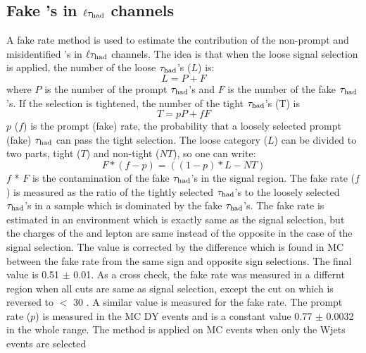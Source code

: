 \subsection{\texorpdfstring{Fake \Tau's in $\ell\tau_{\rm had}$ channels}{Fake taus in lepton-tau channels}}
A fake rate method is used to estimate the contribution of the non-prompt and misidentified \Tau's in $\ell\tau_{\rm had}$ channels. 
The idea is that when the loose signal selection is applied, the number of the loose $\tau_{\rm had}$'s ($L$) is:
\begin{equation}
L = P + F
\end{equation}
where $P$ is the number of the  prompt $\tau_{\rm had}$'s and $F$ is the number of the  fake $\tau_{\rm had}$'s. If the selection is tightened, the number of the tight $\tau_{\rm had}$'s (T) is
\begin{equation}
 T = pP + fF
\end{equation} 
$p$ ($f$) is the prompt (fake) rate, the probability that a loosely selected prompt (fake) $\tau_{\rm had}$ can pass the  tight  selection. 
The loose category ($L$) can be divided to two parts, 
tight ($T$) and non-tight ($NT$), so one can write:
\begin{equation}
   F * (f - p) = ((1 - p) * L - NT)
\end{equation}
$f$ * $F$ is the contamination of the fake $\tau_{\rm had}$'s in the signal region. 
The fake rate ($f$) is measured as the ratio of the tightly selected $\tau_{\rm had}$'s to the loosely 
selected $\tau_{\rm had}$'s in a sample which is dominated by the fake $\tau_{\rm had}$'s. The fake rate is estimated in an environment which is exactly 
same as the signal selection, but the charges of the \Tau and lepton are same instead of the opposite in the case of the signal selection. 
The value is corrected by the difference which is found in MC between the fake rate from the same sign and opposite sign selections. 
The final value is 0.51 $\pm$ 0.01. As a cross check, the fake rate was measured in a differnt region when all cuts are same as signal selection, 
except the cut on \MET which is reversed to \MET $<$ 30 \GeV. A similar value is measured for the fake rate. 
The prompt rate ($p$) is measured in the MC DY events and is a constant value 0.77 $\pm$ 0.0032 in the whole \mttwo range.
The method is applied on MC events when only the Wjets events are selected 
